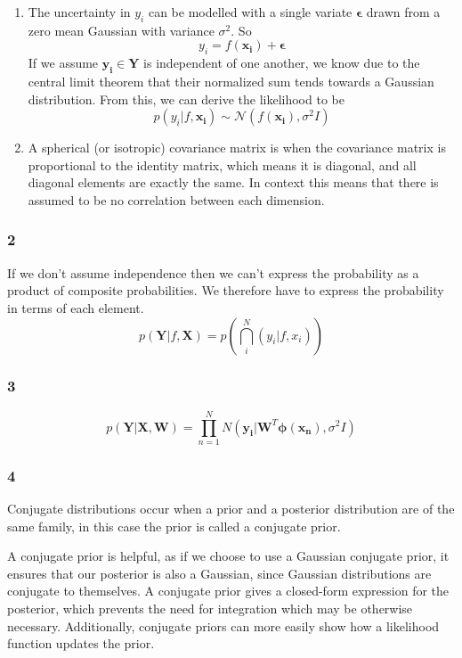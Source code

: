 \documentclass[11pt]{article}
\begin{document}
\begin{enumerate}
\def\labelenumi{\alph{enumi})}
\item
  The uncertainty in \(y_i\) can be modelled with a single variate
  \(\boldsymbol{\epsilon}\) drawn from a zero mean Gaussian with
  variance \(\sigma^2\). So
  \[y_i = f(\boldsymbol{x_i}) + \boldsymbol{\epsilon}\] If we assume
  \(\boldsymbol{y_i} \in \boldsymbol{Y}\) is independent of one another,
  we know due to the central limit theorem that their normalized sum
  tends towards a Gaussian distribution. From this, we can derive the
  likelihood to be
  \[ p(y_i|f, \boldsymbol{x_i}) \sim \mathcal{N}(f(\boldsymbol{x_i}), \sigma^2I)\]
\item
  A spherical (or isotropic) covariance matrix is when the covariance
  matrix is proportional to the identity matrix, which means it is
  diagonal, and all diagonal elements are exactly the same. In context
  this means that there is assumed to be no correlation between each
  dimension.
\end{enumerate}

    \subsubsection{2}\label{section}

If we don't assume independence then we can't express the probability as
a product of composite probabilities. We therefore have to express the
probability in terms of each element. \[
p(\mathbf{Y} | f, \mathbf{X}) = p(\bigcap_i^N (y_i | f, x_i))
\]

    \subsubsection{3}\label{section}

\[
p(\mathbf{Y} | \mathbf{X}, \mathbf{W}) = \prod_{n=1}^{N} N(\boldsymbol{y_i} | \boldsymbol{W}^T\boldsymbol{\phi}(\boldsymbol{x_n}), \sigma^2 I)
\]

    \subsubsection{4}\label{section}

Conjugate distributions occur when a prior and a posterior distribution
are of the same family, in this case the prior is called a conjugate
prior.

A conjugate prior is helpful, as if we choose to use a Gaussian
conjugate prior, it ensures that our posterior is also a Gaussian, since
Gaussian distributions are conjugate to themselves. A conjugate prior
gives a closed-form expression for the posterior, which prevents the
need for integration which may be otherwise necessary. Additionally,
conjugate priors can more easily show how a likelihood function updates
the prior.
\end{document}
